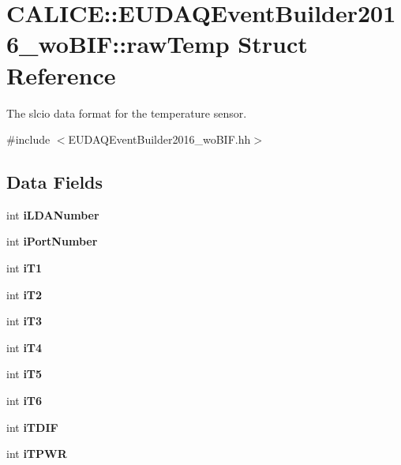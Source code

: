 \section{C\-A\-L\-I\-C\-E\-:\-:E\-U\-D\-A\-Q\-Event\-Builder2016\-\_\-wo\-B\-I\-F\-:\-:raw\-Temp Struct Reference}
\label{structCALICE_1_1EUDAQEventBuilder2016__woBIF_1_1rawTemp}


The slcio data format for the temperature sensor.  




{\ttfamily \#include $<$E\-U\-D\-A\-Q\-Event\-Builder2016\-\_\-wo\-B\-I\-F.\-hh$>$}

\subsection*{Data Fields}
\begin{DoxyCompactItemize}
\item 
int {\bfseries i\-L\-D\-A\-Number}\label{structCALICE_1_1EUDAQEventBuilder2016__woBIF_1_1rawTemp_a7f4eb1483f9f36a45a0bb46be18c9941}

\item 
int {\bfseries i\-Port\-Number}\label{structCALICE_1_1EUDAQEventBuilder2016__woBIF_1_1rawTemp_a02f3bca5a4d64a9cefe89d197a6b00d5}

\item 
int {\bfseries i\-T1}\label{structCALICE_1_1EUDAQEventBuilder2016__woBIF_1_1rawTemp_a86a557bb634cc3d12062fc358d63a57d}

\item 
int {\bfseries i\-T2}\label{structCALICE_1_1EUDAQEventBuilder2016__woBIF_1_1rawTemp_a36cde6f44432b535c8fb4cc1cb3b3b8a}

\item 
int {\bfseries i\-T3}\label{structCALICE_1_1EUDAQEventBuilder2016__woBIF_1_1rawTemp_a556707c287d92730a250c3c041bfc751}

\item 
int {\bfseries i\-T4}\label{structCALICE_1_1EUDAQEventBuilder2016__woBIF_1_1rawTemp_aee2d6f37dff7dc62db0c44ed17b4d1db}

\item 
int {\bfseries i\-T5}\label{structCALICE_1_1EUDAQEventBuilder2016__woBIF_1_1rawTemp_ac3f468937709e80c15725bab438fa230}

\item 
int {\bfseries i\-T6}\label{structCALICE_1_1EUDAQEventBuilder2016__woBIF_1_1rawTemp_afb01fccbb8fc5155b92dc2a5927dd93e}

\item 
int {\bfseries i\-T\-D\-I\-F}\label{structCALICE_1_1EUDAQEventBuilder2016__woBIF_1_1rawTemp_a112457693b3bff5eff3058368e9abffb}

\item 
int {\bfseries i\-T\-P\-W\-R}\label{structCALICE_1_1EUDAQEventBuilder2016__woBIF_1_1rawTemp_a27648525d2fff3ecbe8a4848c7601b0b}

\end{DoxyCompactItemize}


